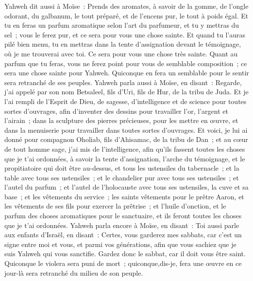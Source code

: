 \begin{multicols}{2}
Yahweh dit aussi à Moïse~: Prends des aromates, à savoir de la gomme, de l'ongle odorant, du galbanum, le tout préparé, et de l'encens pur, le tout à poids égal.
Et tu en feras un parfum aromatique selon l'art du parfumeur, et tu y mettras du sel~; vous le ferez pur, et ce sera pour vous une chose sainte.
Et quand tu l'auras pilé bien menu, tu en mettras dans la tente d'assignation devant le témoignage, où je me trouverai avec toi. Ce sera pour vous une chose très sainte.
Quant au parfum que tu feras, vous ne ferez point pour vous de semblable composition~; ce sera une chose sainte pour Yahweh.
Quiconque en fera un semblable pour le sentir sera retranché de ses peuples.
\VerseOne{}Yahweh parla aussi à Moïse, en disant~:
Regarde, j'ai appelé par son nom Betsaleel, fils d'Uri, fils de Hur, de la tribu de Juda.
Et je l'ai rempli de l'Esprit de Dieu, de sagesse, d'intelligence et de science pour toutes sortes d'ouvrages,
afin d'inventer des dessins pour travailler  l'or, l'argent et l'airain~;
dans la sculpture des pierres précieuses, pour les mettre en œuvre, et dans la menuiserie pour travailler dans toutes sortes d'ouvrages.
Et voici, je lui ai donné pour compagnon Oholiab, fils d'Ahisamac, de la tribu de Dan~; et au cœur de tout homme sage, j'ai mis de l'intelligence, afin qu'ils fassent toutes les choses que je t'ai ordonnées,
à savoir la tente d'assignation, l'arche du témoignage, et le propitiatoire qui doit être au-dessus, et tous les ustensiles du tabernacle~;
et la table avec tous ses ustensiles~; et le chandelier pur avec tous ses ustensiles~; et l'autel du parfum~;
et l'autel de l'holocauste avec tous ses ustensiles, la cuve et sa base~;
et les vêtements du service~; les saints vêtements pour le prêtre Aaron, et les vêtements de ses fils pour exercer la prêtrise~;
et l'huile d'onction, et le parfum des choses aromatiques pour le sanctuaire, et ils feront toutes les choses que je t'ai ordonnées.
Yahweh parla encore à Moïse, en disant~:
Toi aussi parle aux enfants d'Israël, en disant~: Certes, vous garderez mes sabbats, car c'est un signe entre moi et vous, et parmi vos générations, afin que vous sachiez que je suis Yahweh qui vous sanctifie.
Gardez donc le sabbat, car il doit vous être saint. Quiconque le violera sera puni de mort~; quiconque,dis-je, fera une œuvre en ce jour-là sera retranché du milieu de son peuple.

\end{multicols}
